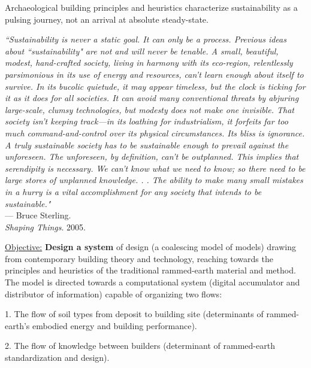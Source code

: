 Archaeological building principles and heuristics characterize sustainability as a pulsing journey, not an arrival at absolute steady-state.

\begin{flushright}
\small{
\textit{
``Sustainability is never a static goal. It can only be a process. Previous ideas about ``sustainability" are not and will never be tenable. A small, beautiful, modest, hand-crafted society, living in harmony with its eco-region, relentlessly parsimonious in its use of energy and resources, can't learn enough about itself to survive. In its bucolic quietude, it may appear timeless, but the clock is ticking for it as it does for all societies. It can avoid many conventional threats by abjuring large-scale, clumsy technologies, but modesty does not make one invisible. That society isn’t keeping track---in its loathing for industrialism, it forfeits far too much command-and-control over its physical circumstances. Its bliss is ignorance.\\
A truly sustainable society has to be sustainable enough to prevail against the unforeseen. The unforeseen, by definition, can’t be outplanned. This implies that serendipity is necessary. We can’t know what we need to know; so there need to be large stores of unplanned knowledge. . . The ability to make many small mistakes in a hurry is a vital accomplishment for any society that intends to be sustainable."}} \\ --- Bruce Sterling. \\ \textit{Shaping Things}. 2005.
\end{flushright}

\vspace{5mm}

\underline{Objective:} \textbf{Design a system} of design (a coalescing model of models) drawing from contemporary building theory and technology, reaching towards the principles and heuristics of the traditional rammed-earth material and method. The model is directed towards a computational system (digital accumulator and distributor of information) capable of organizing two flows:

1. The flow of soil types from deposit to building site (determinants of rammed-earth's embodied energy and building performance).

2. The flow of knowledge between builders (determinant of rammed-earth standardization and design).


